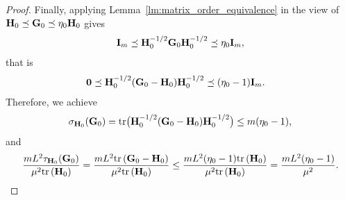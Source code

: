 \documentclass[11pt]{article}
\theoremstyle{plain}
\theoremstyle{definition}
\theoremstyle{remark}
\theoremstyle{plain}
\def\mI {{\bf I}}
\def\G{{\bf G}}
\def\H{{\bf H}}
\def\I{{\bf I}}
\def\0{{\bf 0}}
\def \tr #1{\text{\rm tr}\left(#1\right)}
\begin{document}
\begin{proof}
Finally, applying Lemma~\ref{lm:matrix_order_equivalence} in the view of
$\H_0\preceq\G_0\preceq\eta_0\H_0$ gives
\begin{align*}  
\mI_m\preceq\H_0^{-1/2}\G_0\H_0^{-1/2}\preceq\eta_0\mI_m,
\end{align*}
that is
\begin{align*}
\0
&\preceq\H_0^{-1/2}(\G_0-\H_0)\H_0^{-1/2}
\preceq(\eta_0-1)\I_m.
\end{align*}
Therefore, we achieve
\begin{align*}
\sigma_{\H_0}(\G_0)
={\rm tr}\big(\H_0^{-1/2}(\G_0-\H_0)\H_0^{-1/2}\big)
\leq m(\eta_0-1),
\end{align*}
and
\begin{align*}
\frac{mL^2\tau_{\H_0}(\G_0)}
{\mu^2\tr{\H_0}}
=\frac{mL^2\tr{\G_0-\H_0}}{\mu^2\tr{\H_0}}
\leq\frac{mL^2(\eta_0-1)\tr{\H_0}}{\mu^2\tr{\H_0}}
=\frac{mL^2(\eta_0-1)}{\mu^2}.
\end{align*}
\end{proof}
\end{document}
